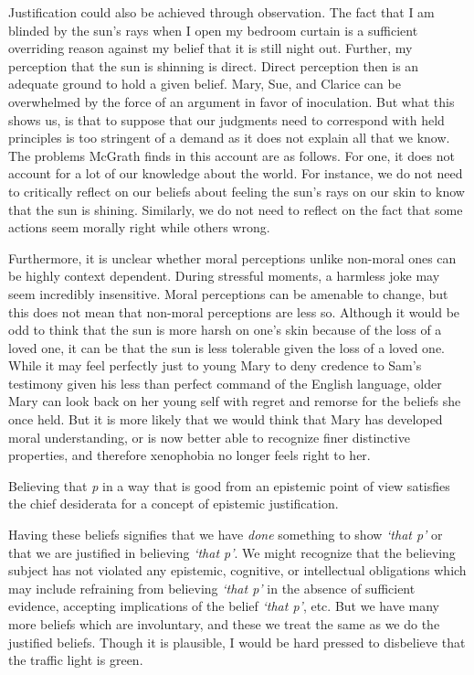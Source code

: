 \documentclass[
  12pt,
]{book}
\theoremstyle{definition}
\theoremstyle{definition}
\theoremstyle{definition}
\theoremstyle{definition}
\theoremstyle{remark}
\begin{document}
Justification could also be achieved through observation. The fact that I am blinded by the sun's rays when I open my bedroom curtain is a sufficient overriding reason against my belief that it is still night out. Further, my perception that the sun is shinning is direct. Direct perception then is an adequate ground to hold a given belief. Mary, Sue, and Clarice can be overwhelmed by the force of an argument in favor of inoculation. But what this shows us, is that to suppose that our judgments need to correspond with held principles is too stringent of a demand as it does not explain all that we know. The problems McGrath finds in this account are as follows. For one, it does not account for a lot of our knowledge about the world. For instance, we do not need to critically reflect on our beliefs about feeling the sun's rays on our skin to know that the sun is shining. Similarly, we do not need to reflect on the fact that some actions seem morally right while others wrong.

Furthermore, it is unclear whether moral perceptions unlike non-moral ones can be highly context dependent. During stressful moments, a harmless joke may seem incredibly insensitive. Moral perceptions can be amenable to change, but this does not mean that non-moral perceptions are less so. Although it would be odd to think that the sun is more harsh on one's skin because of the loss of a loved one, it can be that the sun is less tolerable given the loss of a loved one. While it may feel perfectly just to young Mary to deny credence to Sam's testimony given his less than perfect command of the English language, older Mary can look back on her young self with regret and remorse for the beliefs she once held. But it is more likely that we would think that Mary has developed moral understanding, or is now better able to recognize finer distinctive properties, and therefore xenophobia no longer feels right to her.

Believing that \emph{p} in a way that is good from an epistemic point of view satisfies the chief desiderata for a concept of epistemic justification.

Having these beliefs signifies that we have \emph{done} something to show \emph{`that p'} or that we are justified in believing \emph{`that p'}. We might recognize that the believing subject has not violated any epistemic, cognitive, or intellectual obligations which may include refraining from believing \emph{`that p'} in the absence of sufficient evidence, accepting implications of the belief \emph{`that p'}, etc. But we have many more beliefs which are involuntary, and these we treat the same as we do the justified beliefs. Though it is plausible, I would be hard pressed to disbelieve that the traffic light is green.
\end{document}
